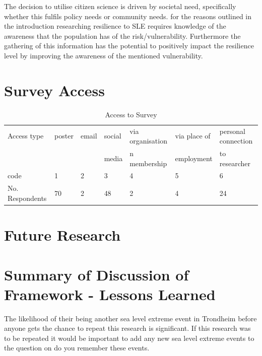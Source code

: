 The decision to utilise citizen science is driven by societal need, specifically whether this fulfils policy needs or community needs. for the reasons outlined in the introduction researching resilience to SLE requires knowledge of the awareness that the population has of the risk/vulnerability. Furthermore the gathering of this information has the potential to positively impact the resilience level by improving the awareness of the mentioned vulnerability. 

\section{Survey Access}

\begin{table}[!ht]
    \centering
    \begin{tabular}{|l|l|l|l|l|l|l|}
    \hline
     Access type & poster & email & social & via organisation  & via place of  & personal connection \\ \newline
       &  & & media & n membership & employment & to researcher \\ \hline
       code & 1 & 2 & 3 & 4 & 5 & 6 \\ \hline
      No. Respondents & 70 & 2 & 48 & 2 & 4 & 24 \\ \hline
    \end{tabular}
      \caption{Access to Survey}
      \label{access_survey}
\end{table}

\section{Future Research}

\section{Summary of Discussion of Framework - Lessons Learned}


The likelihood of their being another sea level extreme event in Trondheim before anyone gets the chance to repeat this research is significant. If this research was to be repeated it would be important to add any new sea level extreme events to the question on do you remember these events. 